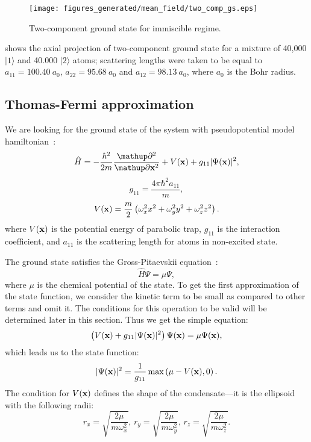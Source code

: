 \begin{figure}
\begin{center}
\texttt{[image: figures\_generated/mean\_field/two\_comp\_gs.eps]}
\caption{Two-component ground state for immiscible regime.}
\label{fig:mean-field:two-comp-gs}
\end{center}
\end{figure}

 shows the axial projection of two-component ground state for a mixture of 40,000 $\vert 1 \rangle$ and 40.000 $\vert 2 \rangle$ atoms;
scattering lengths were taken to be equal to $a_{11} = 100.40\ a_0$, $a_{22} = 95.68\ a_0$ and $a_{12} = 98.13\ a_0$, where $a_0$ is the Bohr radius.


\subsection{Thomas-Fermi approximation}

We are looking for the ground state of the system with pseudopotential model hamiltonian~\cite{Pitaevskii2003}:
\[
	\hat{H} =
		- \frac{\hbar^2}{2m} \frac{\upp^2}{\upp \xvec^2}
		+ V(\xvec)
		+ g_{11} \lvert \Psi(\xvec) \rvert^2,
\]
\[
	g_{11} = \frac{4 \pi \hbar^2 a_{11}}{m},
\]
\begin{equation}
\label{eqn:mean-field:trap-potential}
	V(\mathbf{x}) = \frac{m}{2} \left(
		\omega_x^2 x^2 + \omega_y^2 y^2 + \omega_z^2 z^2
	\right).
\end{equation}
where $V(\mathbf{x})$ is the potential energy of parabolic trap, $g_{11}$ is the interaction coefficient,
and $a_{11}$ is the scattering length for atoms in non-excited state.

The ground state satisfies the Gross-Pitaevskii equation~\cite{Pitaevskii2003}:
\begin{equation}
\label{eqn:mean-field:gs-shroedinger}
	\hat{H} \Psi = \mu \Psi,
\end{equation}
where $\mu$ is the chemical potential of the state.
To get the first approximation of the state function,
we consider the kinetic term to be small as compared to other terms and omit it.
The conditions for this operation to be valid will be determined later in this section.
Thus we get the simple equation:
\[
	\left( V(\mathbf{x}) + g_{11} \lvert \Psi(\mathbf{x}) \rvert^2 \right) \Psi(\mathbf{x}) = \mu \Psi(\mathbf{x}),
\]
which leads us to the state function:
\begin{equation}
\label{eqn:mean-field:tf-gs}
	\lvert \Psi(\mathbf{x}) \rvert^2 = \frac{1}{g_{11}} \max \left( \mu - V(\mathbf{x}), 0 \right).
\end{equation}
The condition for $V(\mathbf{x})$ defines the shape of the condensate---it is the ellipsoid with the following radii:
\begin{equation}
\label{eqn:mean-field:tf-radii}
	r_x = \sqrt{\frac{2\mu}{m \omega_x^2}},\,
	r_y = \sqrt{\frac{2\mu}{m \omega_y^2}},\,
	r_z = \sqrt{\frac{2\mu}{m \omega_z^2}}.
\end{equation}

